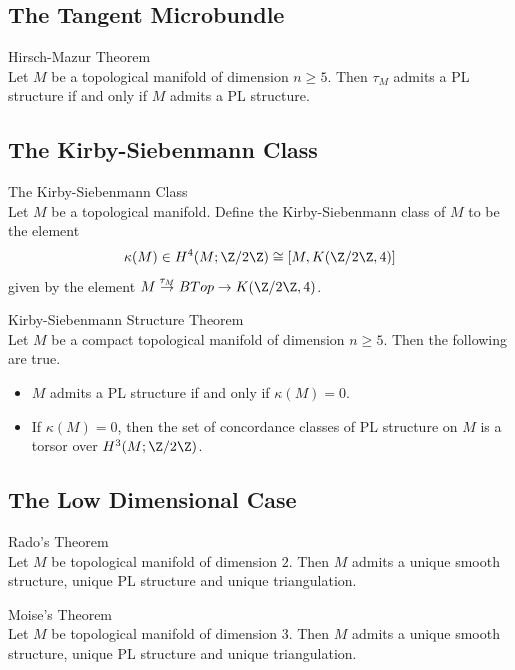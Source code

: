 \documentclass[a4paper]{article}
\begin{document}
\subsection{The Tangent Microbundle}
\begin{thm}{Hirsch-Mazur
 Theorem}{}\\
Let $M$ be a topological manifold of dimension $n\geq 5$. Then $\tau_M$ admits a PL structure if and only if $M$ admits a PL structure. 
\end{thm}

\subsection{The Kirby-Siebenmann Class}
\begin{defn}{The Kirby-Siebenmann Class}{}\\
Let $M$ be a topological manifold. Define the Kirby-Siebenmann class of $M$ to be the element $$\kappa(M)\in H^4(M;\Z/2\Z)\cong[M,K(\Z/2\Z,4)]$$ given by the element $M\overset{\tau_M}{\to}BTop\to K(\Z/2\Z,4)$. 
\end{defn}

\begin{prp}{Kirby-Siebenmann Structure Theorem}{}\\
Let $M$ be a compact topological manifold of dimension $n\geq 5$. Then the following are true. 
\begin{itemize}
\item $M$ admits a PL structure if and only if $\kappa(M)=0$. 
\item If $\kappa(M)=0$, then the set of concordance classes of PL structure on $M$ is a torsor over $H^3(M;\Z/2\Z)$. 
\end{itemize}
\end{prp}

\subsection{The Low Dimensional Case}
\begin{thm}{Rado's Theorem}{}\\
Let $M$ be topological manifold of dimension $2$. Then $M$ admits a unique smooth structure, unique PL structure and unique triangulation. 
\end{thm}

\begin{thm}{Moise's Theorem}{}\\
Let $M$ be topological manifold of dimension $3$. Then $M$ admits a unique smooth structure, unique PL structure and unique triangulation. 
\end{thm}
\end{document}
